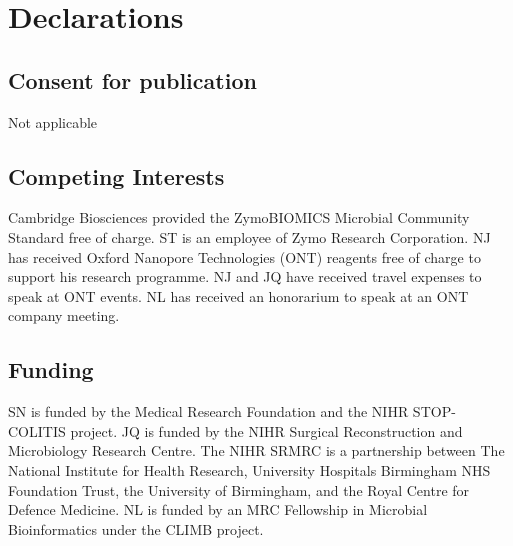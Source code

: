 \documentclass[a4paper,num-refs]{oup-contemporary}
\begin{document}

\section{Declarations}



\subsection{Consent for publication}
Not applicable

\subsection{Competing Interests}
Cambridge Biosciences provided the ZymoBIOMICS Microbial Community Standard free of charge.
ST is an employee of Zymo Research Corporation.
NJ has received Oxford Nanopore Technologies (ONT) reagents free of charge to support his research programme.
NJ and JQ have received travel expenses to speak at ONT events.
NL has received an honorarium to speak at an ONT company meeting.

\subsection{Funding}
SN is funded by the Medical Research Foundation and the NIHR STOP-COLITIS project.
JQ is funded by the NIHR Surgical Reconstruction and Microbiology Research Centre. 
The NIHR SRMRC is a partnership between The National Institute for Health Research, University Hospitals Birmingham NHS Foundation Trust, the University of Birmingham, and the Royal Centre for Defence Medicine.
NL is funded by an MRC Fellowship in Microbial Bioinformatics under the CLIMB project.
\end{document}
